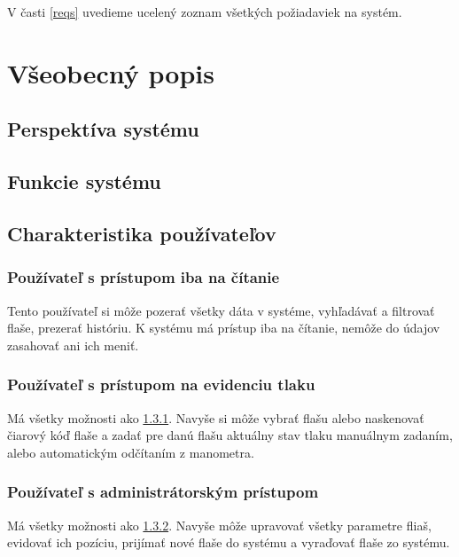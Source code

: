 \documentclass[hreffootnote]{zah}
\begin{document}
V časti \ref{reqs} uvedieme ucelený zoznam všetkých požiadaviek na systém.

\cleardoublepage
\section{Všeobecný popis}
\label{general}

\subsection{Perspektíva systému}
\label{gen:perspective}

\subsection{Funkcie systému}
\label{gen:functions}

\subsection{Charakteristika používateľov}
\label{gen:users}

\subsubsection{Používateľ s prístupom iba na čítanie}
\label{gen:users:ro}

Tento používateľ si môže pozerať všetky dáta v systéme, vyhľadávať a filtrovať flaše, prezerať históriu. K systému má prístup iba na čítanie, nemôže do údajov zasahovať ani ich meniť.

\subsubsection{Používateľ s prístupom na evidenciu tlaku}
\label{gen:users:meter}

Má všetky možnosti ako \ref{gen:users:ro}. Navyše si môže vybrať flašu alebo naskenovať čiarový kóď flaše a zadať pre danú flašu aktuálny stav tlaku manuálnym zadaním, alebo automatickým odčítaním z manometra.

\subsubsection{Používateľ s administrátorským prístupom}
\label{gen:users:admin}

Má všetky možnosti ako \ref{gen:users:meter}. Navyše môže upravovať všetky parametre fliaš, evidovať ich pozíciu, prijímať nové flaše do systému a vyraďovať flaše zo systému.
\end{document}
